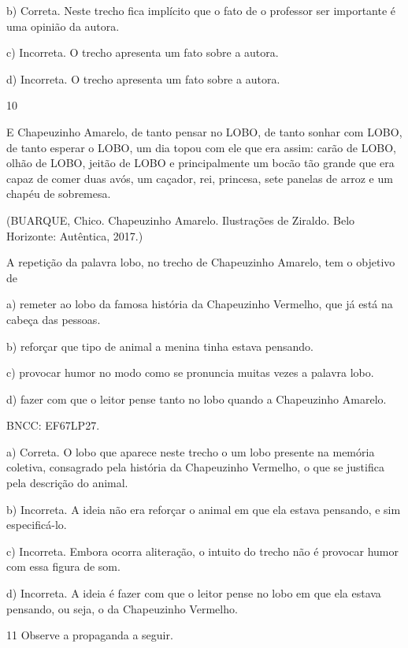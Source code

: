 {b) Correta. Neste trecho fica implícito que o fato de o professor ser
importante é uma opinião da autora.

c) Incorreta. O trecho apresenta um fato sobre a autora.

d) Incorreta. O trecho apresenta um fato sobre a autora.

\num{10}

E Chapeuzinho Amarelo, de tanto pensar no LOBO, de tanto sonhar com
LOBO, de tanto esperar o LOBO, um dia topou com ele que era assim: carão
de LOBO, olhão de LOBO, jeitão de LOBO e principalmente um bocão tão
grande que era capaz de comer duas avós, um caçador, rei, princesa, sete
panelas de arroz e um chapéu de sobremesa.

(BUARQUE, Chico. Chapeuzinho Amarelo. Ilustrações de Ziraldo. Belo
Horizonte: Autêntica, 2017.)

A repetição da palavra lobo, no trecho de Chapeuzinho Amarelo, tem o
objetivo de

a) remeter ao lobo da famosa história da Chapeuzinho Vermelho, que já
está na cabeça das pessoas.

b) reforçar que tipo de animal a menina tinha estava pensando.

c) provocar humor no modo como se pronuncia muitas vezes a palavra lobo.

d) fazer com que o leitor pense tanto no lobo quando a Chapeuzinho
Amarelo.

BNCC: EF67LP27.

a) Correta. O lobo que aparece neste trecho o um lobo presente na
memória coletiva, consagrado pela história da Chapeuzinho Vermelho, o
que se justifica pela descrição do animal.

b) Incorreta. A ideia não era reforçar o animal em que ela estava
pensando, e sim especificá-lo.

c) Incorreta. Embora ocorra aliteração, o intuito do trecho não é
provocar humor com essa figura de som.

d) Incorreta. A ideia é fazer com que o leitor pense no lobo em que ela
estava pensando, ou seja, o da Chapeuzinho Vermelho.

\num{11} Observe a propaganda a seguir.

}
